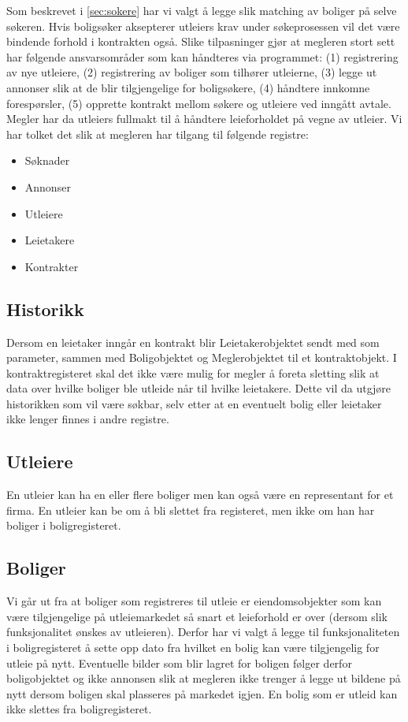 Som beskrevet i \ref{sec:sokere} har vi valgt å legge slik matching av boliger på selve søkeren. Hvis boligsøker aksepterer utleiers krav under søkeprosessen vil det være bindende forhold i kontrakten også. Slike tilpasninger gjør at megleren stort sett har følgende ansvarsområder som kan håndteres via programmet: (1) registrering av nye utleiere, (2) registrering av boliger som tilhører utleierne, (3) legge ut annonser slik at de blir tilgjengelige for boligsøkere, (4) håndtere innkomne forespørsler, (5) opprette kontrakt mellom søkere og utleiere ved inngått avtale. Megler har da utleiers fullmakt til å håndtere leieforholdet på vegne av utleier. 
Vi har tolket det slik at megleren har tilgang til følgende registre:
\begin{itemize}
\item Søknader
\item Annonser
\item Utleiere
\item Leietakere
\item Kontrakter
\end{itemize}

\subsection{Historikk}
Dersom en leietaker inngår en kontrakt blir Leietakerobjektet sendt med som parameter, sammen med Boligobjektet og Meglerobjektet til et kontraktobjekt. I kontraktregisteret skal det ikke være mulig for megler å foreta sletting slik at data over hvilke boliger ble utleide når til hvilke leietakere. Dette vil da utgjøre historikken som vil være søkbar, selv etter at en eventuelt bolig eller leietaker ikke lenger finnes i andre registre.

\subsection{Utleiere}
En utleier kan ha en eller flere boliger men kan også være en representant for et firma. En utleier kan be om å bli slettet fra registeret, men ikke om han har boliger i boligregisteret. 

\subsection{Boliger}
Vi går ut fra at boliger som registreres til utleie er eiendomsobjekter som kan være tilgjengelige på utleiemarkedet så snart et leieforhold er over (dersom slik funksjonalitet ønskes av utleieren). Derfor har vi valgt å legge til funksjonaliteten i boligregisteret å sette opp dato fra hvilket en bolig kan være tilgjengelig for utleie på nytt. Eventuelle bilder som blir lagret for boligen følger derfor boligobjektet og ikke annonsen slik at megleren ikke trenger å legge ut bildene på nytt dersom boligen skal plasseres på markedet igjen. En bolig som er utleid kan ikke slettes fra boligregisteret.

